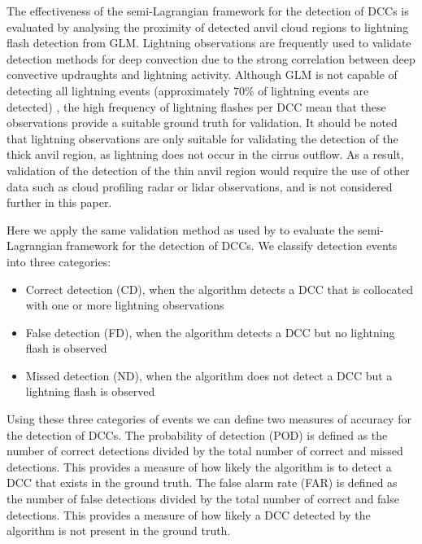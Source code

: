 The effectiveness of the semi-Lagrangian framework for the detection of DCCs is evaluated by analysing the proximity of detected anvil cloud regions to lightning flash detection from GLM.
Lightning observations are frequently used to validate detection methods for deep convection \citep[e.g.,][]{zinner_validation_2013, muller_novel_2019} due to the strong correlation between deep convective updraughts and lightning activity.
Although GLM is not capable of detecting all lightning events (approximately 70\% of lightning events are detected) \citep{peterson_removing_2020}, the high frequency of lightning flashes per DCC mean that these observations provide a suitable ground truth for validation.
It should be noted that lightning observations are only suitable for validating the detection of the thick anvil region, as lightning does not occur in the cirrus outflow.
As a result, validation of the detection of the thin anvil region would require the use of other data such as cloud profiling radar or lidar observations, and is not considered further in this paper.

Here we apply the same validation method as used by \citet{muller_novel_2019} to evaluate the semi-Lagrangian framework for the detection of DCCs.
We classify detection events into three categories:

\begin{itemize}
    \item Correct detection (CD), when the algorithm detects a DCC that is collocated with one or more lightning observations
    \item False detection (FD), when the algorithm detects a DCC but no lightning flash is observed
    \item Missed detection (ND), when the algorithm does not detect a DCC but a lightning flash is observed
\end{itemize}

Using these three categories of events we can define two measures of accuracy for the detection of DCCs.
The probability of detection (POD) is defined as the number of correct detections divided by the total number of correct and missed detections.
This provides a measure of how likely the algorithm is to detect a DCC that exists in the ground truth.
The false alarm rate (FAR) is defined as the number of false detections divided by the total number of correct and false detections.
This provides a measure of how likely a DCC detected by the algorithm is not present in the ground truth.

